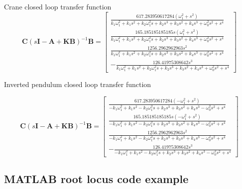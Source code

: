\documentclass{article}
\begin{document}
Crane closed loop transfer function
\begin{equation}
  \mathbf{C} (s\mathbf{I} - \mathbf{A} + \mathbf{KB}) ^{-1} \mathbf{B} = \left[\begin{matrix}\frac{617.283950617284 \left(\omega_{1}^{2} + s^{2}\right)}{k_{1} \omega_{1}^{2} + k_{1} s^{2} + k_{2} \omega_{1}^{2} s + k_{2} s^{3} + k_{3} s^{2} + k_{4} s^{3} + \omega_{0}^{2} s^{2} + s^{4}}\\\frac{165.185185185185 s \left(\omega_{1}^{2} + s^{2}\right)}{k_{1} \omega_{1}^{2} + k_{1} s^{2} + k_{2} \omega_{1}^{2} s + k_{2} s^{3} + k_{3} s^{2} + k_{4} s^{3} + \omega_{0}^{2} s^{2} + s^{4}}\\\frac{1256.2962962963 s^{2}}{k_{1} \omega_{1}^{2} + k_{1} s^{2} + k_{2} \omega_{1}^{2} s + k_{2} s^{3} + k_{3} s^{2} + k_{4} s^{3} + \omega_{0}^{2} s^{2} + s^{4}}\\- \frac{126.41975308642 s^{3}}{k_{1} \omega_{1}^{2} + k_{1} s^{2} + k_{2} \omega_{1}^{2} s + k_{2} s^{3} + k_{3} s^{2} + k_{4} s^{3} + \omega_{0}^{2} s^{2} + s^{4}}\end{matrix}\right]
\end{equation}

Inverted pendulum closed loop transfer function

\begin{equation}
  \mathbf{C} (s\mathbf{I} - \mathbf{A} + \mathbf{KB}) ^{-1} \mathbf{B} = \left[\begin{matrix}\frac{617.283950617284 \left(- \omega_{1}^{2} + s^{2}\right)}{- k_{1} \omega_{1}^{2} + k_{1} s^{2} - k_{2} \omega_{1}^{2} s + k_{2} s^{3} + k_{3} s^{2} + k_{4} s^{3} - \omega_{0}^{2} s^{2} + s^{4}}\\\frac{165.185185185185 s \left(- \omega_{1}^{2} + s^{2}\right)}{- k_{1} \omega_{1}^{2} + k_{1} s^{2} - k_{2} \omega_{1}^{2} s + k_{2} s^{3} + k_{3} s^{2} + k_{4} s^{3} - \omega_{0}^{2} s^{2} + s^{4}}\\\frac{1256.2962962963 s^{2}}{- k_{1} \omega_{1}^{2} + k_{1} s^{2} - k_{2} \omega_{1}^{2} s + k_{2} s^{3} + k_{3} s^{2} + k_{4} s^{3} - \omega_{0}^{2} s^{2} + s^{4}}\\- \frac{126.41975308642 s^{3}}{- k_{1} \omega_{1}^{2} + k_{1} s^{2} - k_{2} \omega_{1}^{2} s + k_{2} s^{3} + k_{3} s^{2} + k_{4} s^{3} - \omega_{0}^{2} s^{2} + s^{4}}\end{matrix}\right]
\end{equation}


\subsection{MATLAB root locus code example}
\end{document}
